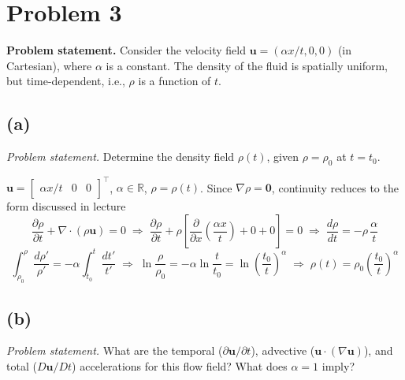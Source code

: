 \documentclass[11pt]{article}
\newcommand{\pd}[2]{\frac{\partial #1}{\partial #2}}
\newcommand{\vect}[1]{\mathbf{#1}}
\begin{document}
\section*{Problem 3}

\noindent\textbf{Problem statement.} Consider the velocity field $\vect u = (\alpha x/t, 0, 0)$ (in
Cartesian), where $\alpha$ is a constant. The density of the fluid is spatially uniform, but
time-dependent, i.e., $\rho$ is a function of $t$.

\subsection*{(a)}

\noindent\textit{Problem statement.} Determine the density field $\rho(t)$, given $\rho = \rho_0$ at
$t = t_0$.

\medskip
\noindent $\vect u = \begin{bmatrix} \alpha x/t & 0 & 0\end{bmatrix}^{\top}$, $\alpha\in\mathbb{R}$, $\rho = \rho(t)$.
Since $\nabla\rho = \vect 0$, continuity reduces to the form discussed in lecture
\begin{equation*}
\pd{\rho}{t} + \nabla\cdot(\rho\vect u) = 0
\;\Rightarrow\;
\pd{\rho}{t} + \rho\left[\pd{}{x}\left(\frac{\alpha x}{t}\right) + 0 + 0\right] = 0
\;\Rightarrow\;
\frac{d\rho}{dt} = -\rho\,\frac{\alpha}{t}
\end{equation*}
\begin{equation*}
\int_{\rho_0}^{\rho} \frac{d\rho'}{\rho'} = -\alpha\int_{t_0}^{t}\frac{dt'}{t'}
\;\Rightarrow\;
\ln\frac{\rho}{\rho_0} = -\alpha\ln\frac{t}{t_0} = \ln\left(\frac{t_0}{t}\right)^{\alpha}
\;\Rightarrow\;
\boxed{\rho(t) = \rho_0\left(\frac{t_0}{t}\right)^{\alpha}}
\end{equation*}

\subsection*{(b)}

\noindent\textit{Problem statement.} What are the temporal ($\partial\vect u/\partial t$), advective
($\vect u\cdot(\nabla\vect u)$), and total ($D\vect u/Dt$) accelerations for this flow field? What
does $\alpha = 1$ imply?

\medskip
\end{document}
